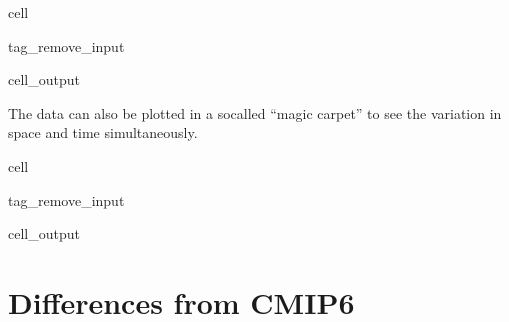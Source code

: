\documentclass[letterpaper,10pt,english]{jupyterBook}
\begin{document}
\begin{sphinxuseclass}{cell}
\begin{sphinxuseclass}{tag_remove_input}\begin{sphinxVerbatimOutput}

\begin{sphinxuseclass}{cell_output}
\noindent{}

\end{sphinxuseclass}\end{sphinxVerbatimOutput}

\end{sphinxuseclass}
\end{sphinxuseclass}
\sphinxAtStartPar
The data can also be plotted in a so\sphinxhyphen{}called “magic carpet”
to see the variation in space and time simultaneously.

\begin{sphinxuseclass}{cell}
\begin{sphinxuseclass}{tag_remove_input}\begin{sphinxVerbatimOutput}

\begin{sphinxuseclass}{cell_output}
\noindent{}

\end{sphinxuseclass}\end{sphinxVerbatimOutput}

\end{sphinxuseclass}
\end{sphinxuseclass}

\section{Differences from CMIP6}
\label{\detokenize{user-guide-historical:differences-from-cmip6}}
\end{document}
